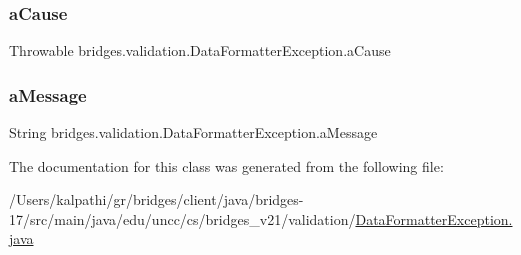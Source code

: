 \subsubsection{\texorpdfstring{a\+Cause}{aCause}}
{\footnotesize\ttfamily Throwable bridges.\+validation.\+Data\+Formatter\+Exception.\+a\+Cause}

\mbox{\label{classbridges_1_1validation_1_1_data_formatter_exception_a8cab4688a8a80a0575bcda28e6ac7b8c}} 
\subsubsection{\texorpdfstring{a\+Message}{aMessage}}
{\footnotesize\ttfamily String bridges.\+validation.\+Data\+Formatter\+Exception.\+a\+Message}



The documentation for this class was generated from the following file\+:\begin{DoxyCompactItemize}
\item 
/\+Users/kalpathi/gr/bridges/client/java/bridges-\/17/src/main/java/edu/uncc/cs/bridges\+\_\+v21/validation/\mbox{\hyperlink{_data_formatter_exception_8java}{Data\+Formatter\+Exception.\+java}}\end{DoxyCompactItemize}
